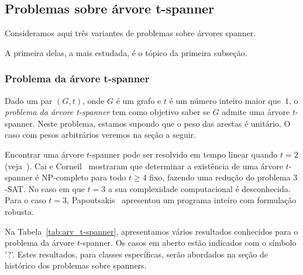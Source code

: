 \subsection{Problemas sobre árvore t-spanner}
\label{sec:comp_arv_spanner}

Consideramos aqui três variantes de problemas sobre árvores spanner.

A primeira delas, a mais estudada,  é o tópico da primeira subseção.

\subsubsection{Problema da árvore t-spanner}

Dado um par $(G,t)$, onde $G$ é um grafo e $t$ é um número inteiro maior que~$1$, o \emph{problema da árvore t-spanner} tem como objetivo saber se $G$ admite uma árvore $t$-spanner. Neste problema,
  estamos supondo que o peso das arestas é unitário. O caso com pesos arbitrários veremos na seção a seguir.

Encontrar uma árvore $t$-spanner pode ser resolvido em tempo linear quando $t = 2$ (veja~\cite{Bondy1989,Cai1992,CaiC1995}).  Cai e Corneil~\cite{Cai1992,CaiC1995} mostraram que determinar a existência de uma árvore $t$-spanner é NP-completo para todo $t \ge 4$ fixo, fazendo uma redução do problema $3$-SAT. No caso em que $t=3$ a sua complexidade computacional é desconhecida.
Para o caso $t=3$, Papoutsakis~\cite{Papoutsakis2013} apresentou um programa inteiro com formulação robusta.

Na Tabela~\ref{tab:arv_t-spanner}, apresentamos vários resultados conhecidos para o problema da árvore $t$-spanner. Os casos em aberto estão indicados com o símbolo '?'. Estes resultados, para classes específicas, serão abordados na seção de histórico dos problemas sobre spanners.



